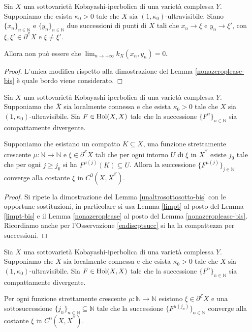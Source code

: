\begin{lm} \label{nonazeroplease}
    Sia $X$ una sottovarietà Kobayashi-iperbolica di una varietà complessa $Y$. Supponiamo che esista $\kappa_0>0$ tale che $X$ sia $(1,\kappa_0)$-ultravisibile. Siano $\{x_n\}_{n\in\mathbb{N}}$ e $\{y_n\}_{n\in\mathbb{N}}$ due successioni di punti di $X$ tali che $x_n\longrightarrow\xi$ e $y_n\longrightarrow\xi'$, con $\xi,\xi'\in\partial^\mathcal{E}X$ e $\xi\not=\xi'$.
    
    Allora non può essere che $\displaystyle\lim_{n\longrightarrow+\infty}k_X(x_n,y_n)=0$.
\end{lm}

\begin{proof}
    L'unica modifica rispetto alla dimostrazione del Lemma \ref{nonazeroplease-bis} è quale bordo viene considerato.
\end{proof}

\begin{lm} \label{unaltrosottosotto}
    Sia $X$ una sottovarietà Kobayashi-iperbolica di una varietà complessa $Y$. Supponiamo che $\overline{X}$ sia localmente connessa e che esista $\kappa_0>0$ tale che $X$ sia $(1,\kappa_0)$-ultravisibile. Sia $F\in\textnormal{Hol}(X,X)$ tale che la successione $\{F^n\}_{n\in\mathbb{N}}$ sia compattamente divergente.
    
    Supponiamo che esistano un compatto $K\subseteq X$, una funzione strettamente crescente $\mu:\mathbb{N}\longrightarrow\mathbb{N}$ e $\xi\in\partial^\mathcal{E}X$ tali che per ogni intorno $U$ di $\xi$ in $\overline{X}^\mathcal{E}$ esiste $j_0$ tale che per ogni $j\ge j_0$ si ha $F^{\mu(j)}(K)\subseteq U$. Allora la successione $\{F^{\mu(j)}\}_{j\in\mathbb{N}}$ converge alla costante $\xi$ in $C^0(X,\overline{X}^\mathcal{E})$.
\end{lm}

\begin{proof}
    Si ripete la dimostrazione del Lemma \ref{unaltrosottosotto-bis} con le opportune sostituzioni, in particolare si usa Lemma \ref{limpt} al posto del Lemma \ref{limpt-bis} e il Lemma \ref{nonazeroplease} al posto del Lemma \ref{nonazeroplease-bis}. Ricordiamo anche per l'Osservazione \ref{endiscptsucc} si ha la compattezza per successioni.
\end{proof}

\begin{lm} \label{estraiunasotto}
    Sia $X$ una sottovarietà Kobayashi-iperbolica di una varietà complessa $Y$. Supponiamo che $\overline{X}$ sia localmente connessa e che esista $\kappa_0>0$ tale che $X$ sia $(1,\kappa_0)$-ultravisibile. Sia $F\in\textnormal{Hol}(X,X)$ tale che la successione $\{F^n\}_{n\in\mathbb{N}}$ sia compattamente divergente.

    Per ogni funzione strettamente crescente $\mu:\mathbb{N}\longrightarrow\mathbb{N}$ esistono $\xi\in\partial^\mathcal{E}X$ e una sottosuccessione $\{j_n\}_{n\in\mathbb{N}}\subseteq\mathbb{N}$ tale che la successione $\{F^{\mu(j_n)}\}_{n\in\mathbb{N}}$ converge alla costante $\xi$ in $C^0(X,\overline{X}^\mathcal{E})$.
\end{lm}

